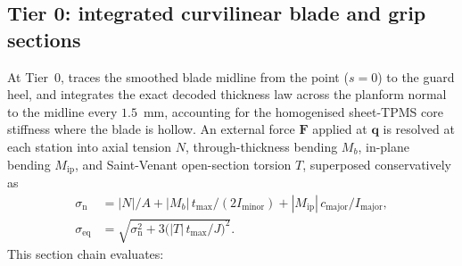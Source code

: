 \subsection{Tier 0: integrated curvilinear blade and grip sections}
At Tier~0,  traces the smoothed blade midline from the point ($s = 0$) to the guard heel, and
 integrates the exact decoded thickness law across the planform normal to the midline every $1.5$~mm,
accounting for the homogenised sheet-TPMS core stiffness where the blade is hollow. An external force $\mathbf{F}$ applied at
$\mathbf{q}$ is resolved at each station into axial tension $N$, through-thickness bending $M_b$, in-plane bending $M_\mathrm{ip}$,
and Saint-Venant open-section torsion $T$, superposed conservatively as
\begin{equation}
\begin{aligned}
\sigma_\mathrm{n} &= |N|/A + |M_b|\,t_\mathrm{max}/(2I_\mathrm{minor}) + |M_\mathrm{ip}|\,c_\mathrm{major}/I_\mathrm{major}, \\
\sigma_\mathrm{eq} &= \sqrt{\sigma_\mathrm{n}^2 + 3\bigl(|T|\,t_\mathrm{max}/J\bigr)^2}.
\end{aligned}
\end{equation}
This section chain evaluates:
